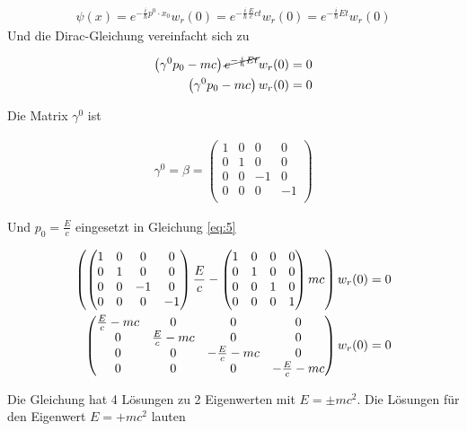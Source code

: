 \begin{align}
  \label{eq:2}
  \psi(x) =  e^{-\frac{i}{\hbar}p^0\cdot x_0}w_r(0) = e^{-\frac{i}{\hbar}\frac{E}{c}ct  }w_r(0) =e^{-\frac{i}{\hbar}Et  }w_r(0)
\end{align}
Und die Dirac-Gleichung vereinfacht sich zu

\begin{align}
  \label{eq:5}
  \left(\gamma^0p_0 - mc\right) \cancel{e^{-\frac{i}{\hbar}Et  }} w_r(0)  &= 0 \notag\\
 \left(\gamma^0p_0 - mc\right) w_r(0)  &= 0 
\end{align}

Die Matrix \(\gamma^0\) ist

\begin{align}
  \label{eq:6}
  \gamma^0 = \beta =
  \begin{pmatrix}
    1&0&0&0\\
    0&1&0&0\\ 
    0&0&-1&0\\
    0&0&0&-1\\
  \end{pmatrix}
\end{align}

Und \(p_0=\frac{E}{c}\) eingesetzt in Gleichung \eqref{eq:5}

\begin{align}
  \label{eq:7}
   \left( 
  \begin{pmatrix}
    1&0&0&0\\
    0&1&0&0\\ 
    0&0&-1&0\\
    0&0&0&-1
  \end{pmatrix}\frac{E}{c} 
-  \begin{pmatrix}
    1&0&0&0\\
    0&1&0&0\\ 
    0&0&1&0\\
    0&0&0&1
  \end{pmatrix}
  mc\right) w_r(0)  &= 0 \notag \\
 \begin{pmatrix}
    \frac{E}{c} - mc&0&0&0\\
    0&\frac{E}{c} - mc&0&0\\ 
    0&0&-\frac{E}{c} - mc&0\\
    0&0&0&-\frac{E}{c} - mc
  \end{pmatrix} w_r(0) &=0
\end{align}

Die Gleichung hat 4 Lösungen zu 2 Eigenwerten mit \(E=\pm mc^2\). Die Lösungen für den Eigenwert \(E=+mc^2\) lauten

